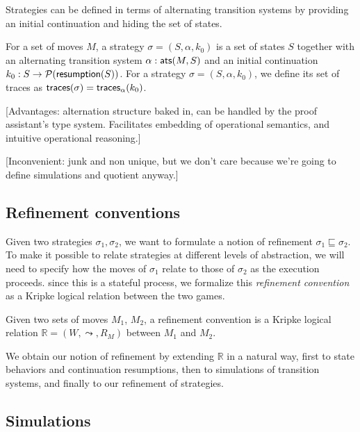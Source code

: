 Strategies can be defined in terms of alternating transition systems
by providing an initial continuation and hiding the set of states.

\begin{definition}[Strategy]
For a set of moves $M$,
a strategy $\sigma = (S, \alpha, k_0)$
is a set of states $S$ together with
an alternating transition system $\alpha :  \mathsf{ats} (M, S)$ and
an initial continuation $k_0 : S \rightarrow \mathcal{P}( \mathsf{resumption} (S))$.
For a strategy $\sigma = (S, \alpha, k_0)$,
we define its set of traces as
$ \mathsf{traces} (\sigma) =  \mathsf{traces} _\alpha (k_0)$.
\end{definition}

[Advantages: alternation structure baked in,
can be handled by the proof assistant's type system.
Facilitates embedding of operational semantics,
and intuitive operational reasoning.]

[Inconvenient: junk and non unique,
but we don't care because we're going to
define simulations and quotient anyway.]

\subsection{Refinement conventions}

Given two strategies $\sigma_1, \sigma_2$,
we want to formulate a notion of refinement
$\sigma_1 \sqsubseteq \sigma_2$.
To make it possible to relate strategies at different
levels of abstraction,
we will need to specify how the moves of $\sigma_1$
relate to those of $\sigma_2$
as the execution proceeds.
since this is a stateful process,
we formalize this \emph{refinement convention}
as a Kripke logical relation between the two games.

\begin{definition}
Given two sets of moves $M_1$, $M_2$,
a refinement convention
is a Kripke logical relation $\mathbb{R} = (W, \leadsto, R_M)$
between $M_1$ and $M_2$.
\end{definition}

We obtain our notion of refinement by extending $\mathbb{R}$
in a natural way,
first to state behaviors and continuation resumptions,
then to simulations of transition systems,
and finally to our refinement of strategies.

\subsection{Simulations}

